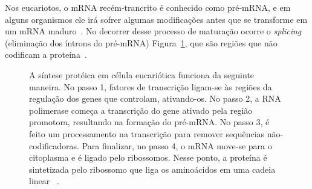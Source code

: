 Nos eucariotos, o mRNA recém-trancrito é conhecido como pré-mRNA, e em alguns organismos ele irá sofrer algumas modificações antes que se transforme em um mRNA maduro~\citep{silva:2001}. No decorrer desse processo de maturação ocorre o \textsl{splicing} (eliminação dos íntrons do pré-mRNA) Figura~\ref{fig:processo-sintese-proteina}, que são regiões que não codificam a proteína~\citep{lodish:2005, Lundblad:2007}. 

\begin{figure} [htb!]
\centering
{}
\caption{A síntese protéica em célula eucariótica funciona da seguinte maneira. No passo 1, fatores de transcrição ligam-se às regiões da regulação dos genes que controlam, ativando-os. No passo 2, a RNA polimerase começa a transcrição do gene ativado pela região promotora, resultando na formação do pré-mRNA. No passo 3, é feito um processamento na transcrição para remover sequências não-codificadoras. Para finalizar, no passo 4, o mRNA move-se para o citoplasma e é ligado pelo ribossomos. Nesse ponto, a proteína é sintetizada pelo ribossomo que liga os aminoácidos em uma cadeia linear ~\citep{lodish:2005}. \label{fig:processo-sintese-proteina}}
\end{figure}

